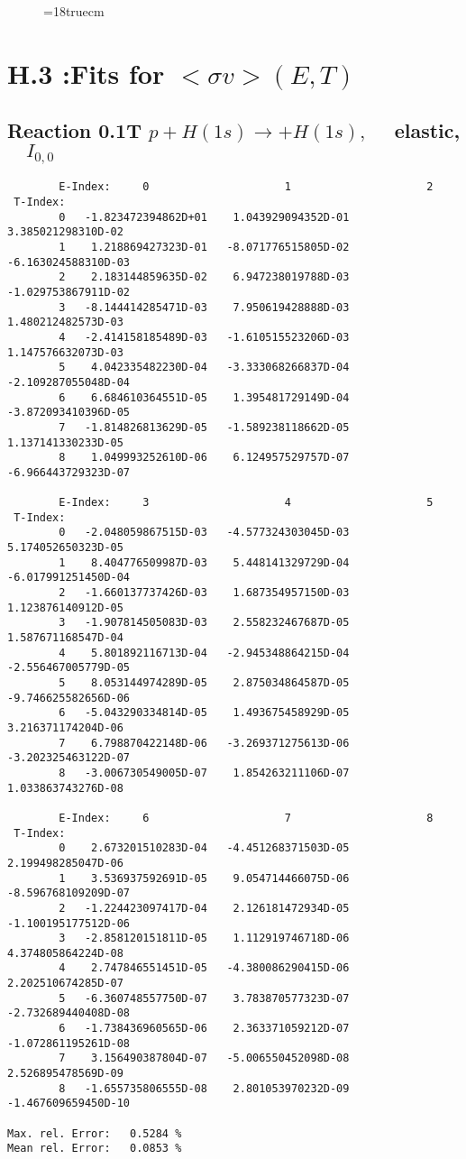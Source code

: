 \begin{figure} \label{2.18B}
\epsfxsize=18truecm
\end{figure}
\newpage


\section{H.3 :Fits for $<\sigma v> (E,T)$}


\subsection{
Reaction 0.1T  $p + H(1s) \rightarrow  + H(1s),\quad
$ elastic,$\quad I_{0,0}$
}




\begin{verbatim}
        E-Index:     0                     1                     2
 T-Index:
        0   -1.823472394862D+01    1.043929094352D-01    3.385021298310D-02
        1    1.218869427323D-01   -8.071776515805D-02   -6.163024588310D-03
        2    2.183144859635D-02    6.947238019788D-03   -1.029753867911D-02
        3   -8.144414285471D-03    7.950619428888D-03    1.480212482573D-03
        4   -2.414158185489D-03   -1.610515523206D-03    1.147576632073D-03
        5    4.042335482230D-04   -3.333068266837D-04   -2.109287055048D-04
        6    6.684610364551D-05    1.395481729149D-04   -3.872093410396D-05
        7   -1.814826813629D-05   -1.589238118662D-05    1.137141330233D-05
        8    1.049993252610D-06    6.124957529757D-07   -6.966443729323D-07

        E-Index:     3                     4                     5
 T-Index:
        0   -2.048059867515D-03   -4.577324303045D-03    5.174052650323D-05
        1    8.404776509987D-03    5.448141329729D-04   -6.017991251450D-04
        2   -1.660137737426D-03    1.687354957150D-03    1.123876140912D-05
        3   -1.907814505083D-03    2.558232467687D-05    1.587671168547D-04
        4    5.801892116713D-04   -2.945348864215D-04   -2.556467005779D-05
        5    8.053144974289D-05    2.875034864587D-05   -9.746625582656D-06
        6   -5.043290334814D-05    1.493675458929D-05    3.216371174204D-06
        7    6.798870422148D-06   -3.269371275613D-06   -3.202325463122D-07
        8   -3.006730549005D-07    1.854263211106D-07    1.033863743276D-08

        E-Index:     6                     7                     8
 T-Index:
        0    2.673201510283D-04   -4.451268371503D-05    2.199498285047D-06
        1    3.536937592691D-05    9.054714466075D-06   -8.596768109209D-07
        2   -1.224423097417D-04    2.126181472934D-05   -1.100195177512D-06
        3   -2.858120151811D-05    1.112919746718D-06    4.374805864224D-08
        4    2.747846551451D-05   -4.380086290415D-06    2.202510674285D-07
        5   -6.360748557750D-07    3.783870577323D-07   -2.732689440408D-08
        6   -1.738436960565D-06    2.363371059212D-07   -1.072861195261D-08
        7    3.156490387804D-07   -5.006550452098D-08    2.526895478569D-09
        8   -1.655735806555D-08    2.801053970232D-09   -1.467609659450D-10

Max. rel. Error:   0.5284 %
Mean rel. Error:   0.0853 %
\end{verbatim}
